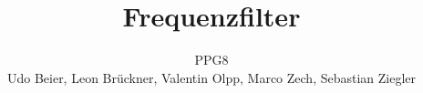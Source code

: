 


\title{Frequenzfilter}
\date{}
\author{PPG8\\
Udo Beier, Leon Brückner, Valentin Olpp, Marco Zech, Sebastian Ziegler}
\tableofcontents
\listoffigures







